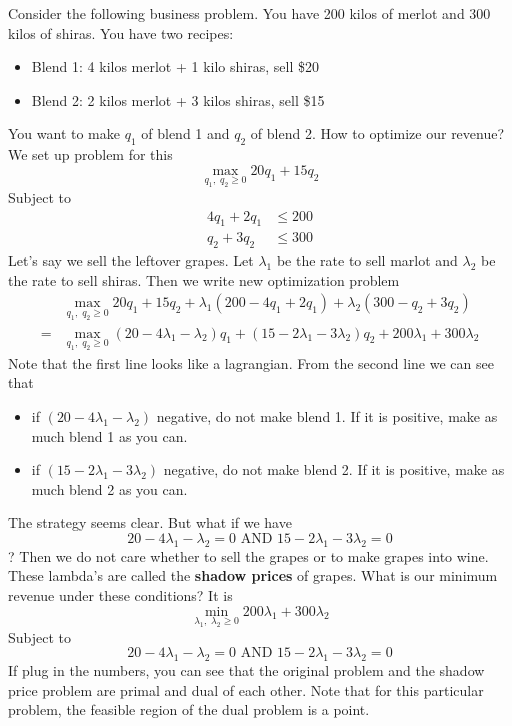 \begin{example}[Winery]
	Consider the following business problem. You have 200 kilos of merlot and 300 kilos of shiras. You have two recipes:
	\begin{itemize}
		\item Blend 1: 4 kilos merlot + 1 kilo shiras, sell \$20
		\item Blend 2: 2 kilos merlot + 3 kilos shiras, sell \$15
	\end{itemize}
	You want to make $q_1$ of blend 1 and $q_2$ of blend 2. How to optimize our revenue? We set up problem for this
	\[
\max_{q_1,\; q_2 \ge 0} 20q_1 +15q_2
	\]
	Subject to
	\begin{align*}
		4q_1+2q_1&\le 200\\
		q_2+3q_2&\le 300
	\end{align*}
	Let's say we sell the leftover grapes. Let $\lambda_1$ be the rate to sell marlot and $\lambda_2$ be the rate to sell shiras. Then we write new optimization problem
	\begin{align*}
		&\max_{q_1,\; q_2 \ge 0} 20q_1 +15q_2 +\lambda_1(200-4q_1+2q_1) +\lambda_2(300-q_2+3q_2)\\
		=& \max_{q_1,\; q_2 \ge 0} (20-4 \lambda_1- \lambda_2)q_1+(15-2 \lambda_1-3 \lambda_2)q_2+200 \lambda_1+300 \lambda_2
	\end{align*}
	Note that the first line looks like a lagrangian. From the second line we can see that
	\begin{itemize}
		\item if $(20-4 \lambda_1- \lambda_2)$ negative, do not make blend 1. If it is positive, make as much blend 1 as you can.
		\item if $(15-2 \lambda_1-3 \lambda_2)$ negative, do not make blend 2. If it is positive, make as much blend 2 as you can.
	\end{itemize}
	The strategy seems clear. But what if we have
	\[
20-4 \lambda_1- \lambda_2 = 0 \text{ AND } 15-2 \lambda_1-3 \lambda_2 = 0
	\]? Then we do not care whether to sell the grapes or to make grapes into wine. These lambda's are called the \textbf{shadow prices} of grapes. What is our minimum revenue under these conditions? It is
	\[
\min_{\lambda_1, \; \lambda_2 \ge 0} 200 \lambda_1+300 \lambda_2
	\]
	Subject to
	\[
20-4 \lambda_1- \lambda_2 = 0 \text{ AND } 15-2 \lambda_1-3 \lambda_2 = 0
	\]
	If plug in the numbers, you can see that the original problem and the shadow price problem are primal and dual of each other. Note that for this particular problem, the feasible region of the dual problem is a point.
\end{example}

